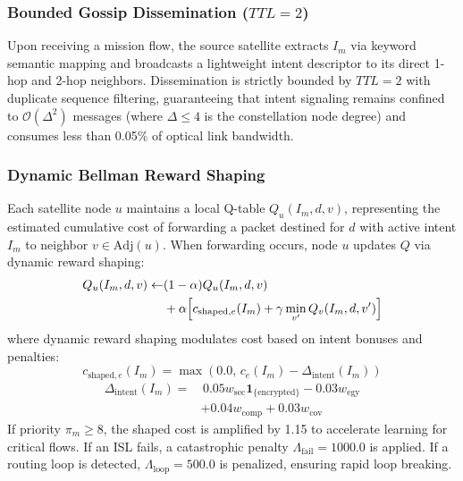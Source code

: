 \documentclass[journal]{IEEEtran}
\begin{document}
\subsubsection{Bounded Gossip Dissemination ($TTL = 2$)}
Upon receiving a mission flow, the source satellite extracts $I_m$ via keyword semantic mapping and broadcasts a lightweight intent descriptor to its direct 1-hop and 2-hop neighbors. Dissemination is strictly bounded by $TTL = 2$ with duplicate sequence filtering, guaranteeing that intent signaling remains confined to $\mathcal{O}(\Delta^2)$ messages (where $\Delta \le 4$ is the constellation node degree) and consumes less than 0.05\% of optical link bandwidth.

\subsubsection{Dynamic Bellman Reward Shaping}
Each satellite node $u$ maintains a local Q-table $Q_u(I_m, d, v)$, representing the estimated cumulative cost of forwarding a packet destined for $d$ with active intent $I_m$ to neighbor $v \in \text{Adj}(u)$. When forwarding occurs, node $u$ updates $Q$ via dynamic reward shaping:
\begin{equation}
\begin{split}
Q_u(I_m, d, v) \leftarrow & (1 - \alpha) Q_u(I_m, d, v) \\
& + \alpha \Bigl[ c_{\text{shaped},e}(I_m) + \gamma \min_{v'} Q_v(I_m, d, v') \Bigr]
\end{split}
\label{eq:q_update}
\end{equation}
where dynamic reward shaping modulates cost based on intent bonuses and penalties:
\begin{equation}
c_{\text{shaped},e}(I_m) = \max\left(0.0, \, c_e(I_m) - \Delta_{\text{intent}}(I_m)\right)
\label{eq:shaped_cost}
\end{equation}
\begin{equation}
\begin{split}
\Delta_{\text{intent}}(I_m) = & \, 0.05 w_{\text{sec}} \mathbf{1}_{\{\text{encrypted}\}} - 0.03 w_{\text{egy}} \\
& + 0.04 w_{\text{comp}} + 0.03 w_{\text{cov}}
\end{split}
\end{equation}
If priority $\pi_m \ge 8$, the shaped cost is amplified by 1.15 to accelerate learning for critical flows. If an ISL fails, a catastrophic penalty $\Lambda_{\text{fail}} = 1000.0$ is applied. If a routing loop is detected, $\Lambda_{\text{loop}} = 500.0$ is penalized, ensuring rapid loop breaking.
\end{document}
